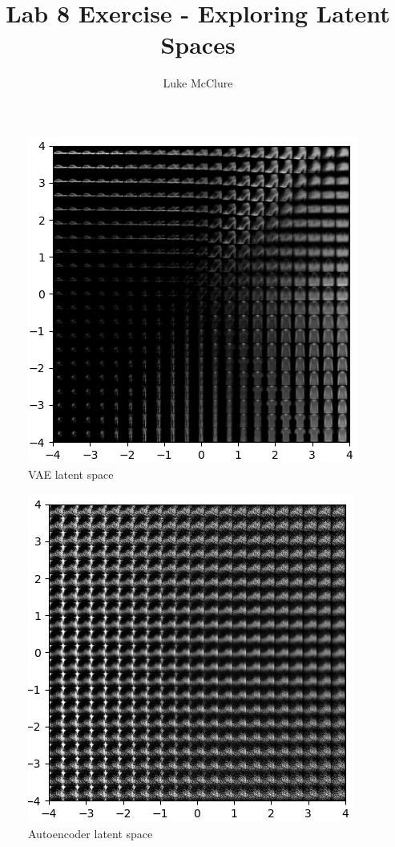 \documentclass[sigconf]{acmart}
\begin{document}
\title{Lab 8 Exercise - Exploring Latent Spaces}
\author{Luke McClure}

\maketitle
\pagestyle{myheadings}

\begin{figure}
    \includegraphics[width=.4\textwidth]{../VAE.png}
    \caption{VAE latent space}
    \label{fig:VAE}
\end{figure}
\begin{figure}
    \includegraphics[width=.4\textwidth]{../AE.png}
    \caption{Autoencoder latent space}
    \label{fig:AE}
\end{figure}
\end{document}

